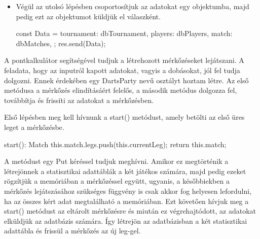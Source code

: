 \begin{itemize}
\begin{cpp}
{      const dbMatch = await NewMatchModel.create(newMatch);
      dbMatches.push(dbMatch);
    }
\end{cpp}
\item Végül az utolsó lépésben csoportosítjuk az adatokat egy objektumba, majd pedig ezt az objektumot küldjük el válaszként.
\begin{cpp}
const Data = {
      tournament: dbTournament,
      players: dbPlayers,
      match: dbMatches,
    };
    res.send(Data);
\end{cpp}
\end{itemize}
A pontkalkulátor segítségével tudjuk a létrehozott mérkőzéseket lejátszani. A feladata, hogy az inputról kapott adatokat, vagyis a dobásokat, jól fel tudja dolgozni. Ennek érdekében egy DartsParty nevű osztályt hoztam létre. Az első metódusa a mérkőzés elindításáért felelős, a második metódus dolgozza fel, továbbítja és frissíti az adatokat a mérkőzésben.

Első lépésben meg kell hívnunk a start() metódust, amely betölti az első üres leget a mérkőzésbe.
\begin{cpp}
  start(): Match {
    this.match.legs.push(this.currentLeg);
    return this.match;
  }
\end{cpp}

A metódust egy Put kéréssel tudjuk meghívni. Amikor ez megtörténik a létrejönnek a statisztikai adattáblák a két játékos számára, majd pedig ezeket rögzítjük a memóriában a mérkőzéssel együtt, ugyanis, a későbbiekben a mérkőzés lejátszásához szükséges függvény is csak akkor fog helyesen lefordulni, ha az összes kért adat megtalálható a memóriában. Ezt követően hívjuk meg a start() metódust az eltárolt mérkőzésre és miután ez végrehajtódott, az adatokat elküldjük az adatbázis számára. Így létrejön az adatbázisban a két statisztikai adattábla és frissül a mérkőzés az új leg-gel.

